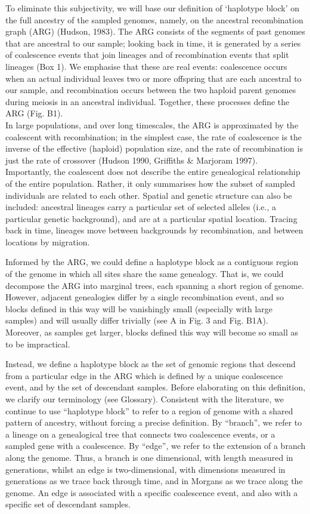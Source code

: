 \documentclass[twocolumn]{bmcart}%
\begin{document}
To eliminate this subjectivity, we will base our definition of ‘haplotype block’ on the full ancestry of the sampled genomes, namely, on the ancestral recombination graph (ARG) (Hudson, 1983). The ARG consists of the segments of past genomes that are ancestral to our sample; looking back in time, it is generated by a series of coalescence events that join lineages and of recombination events that split lineages (Box 1). We emphasise that these are real events: coalescence occurs when an actual individual leaves two or more offspring that are each ancestral to our sample, and recombination occurs between the two haploid parent genomes during meiosis in an ancestral individual. Together, these processes define the ARG (Fig. B1). \\
In large populations, and over long timescales, the ARG is approximated by the coalescent with recombination; in the simplest case, the rate of coalescence is the inverse of the effective (haploid) population size, and the rate of recombination is just the rate of crossover (Hudson 1990, Griffiths \& Marjoram 1997). Importantly, the coalescent does not describe the entire genealogical relationship of the entire population. Rather, it only summarises how the subset of sampled individuals are related to each other. Spatial and genetic structure can also be included: ancestral lineages carry a particular set of selected alleles (i.e., a particular genetic background), and are at a particular spatial location. Tracing back in time, lineages move between backgrounds by recombination, and between locations by migration.

Informed by the ARG, we could define a haplotype block as a contiguous region of the genome in which all sites share the same genealogy. That is, we could decompose the ARG into marginal trees, each spanning a short region of genome. However, adjacent genealogies differ by a single recombination event, and so blocks defined in this way will be vanishingly small (especially with large samples) and will usually differ trivially (see A in Fig. 3 and Fig. B1A). Moreover, as samples get larger, blocks defined this way will become so small as to be impractical.

Instead, we define a haplotype block as the set of genomic regions that descend from a particular edge in the ARG which is defined by a unique coalescence event, and by the set of descendant samples.  Before elaborating on this definition, we clarify our terminology (see Glossary).  Consistent with the literature, we continue to use “haplotype block” to refer to a region of genome with a shared pattern of ancestry, without forcing a precise definition. By “branch”, we refer to a lineage on a genealogical tree that connects two coalescence events, or a sampled gene with a coalescence.  By “edge”, we refer to the extension of a branch along the genome.  Thus, a branch is one dimensional, with length measured in generations, whilst an edge is two-dimensional, with dimensions measured in generations as we trace back through time, and in Morgans as we trace along the genome.  An edge is associated with a specific coalescence event, and also with a specific set of descendant samples.
\end{document}
